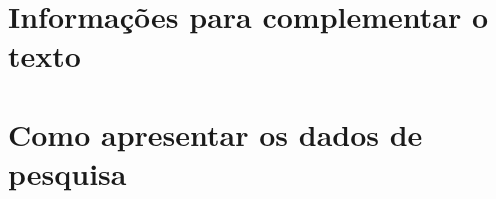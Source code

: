 
\begin{apendicesenv}
\chapter{Informações para complementar o texto}
\lipsum[8]


\chapter{Como apresentar os dados de pesquisa}

\lipsum[8]

\end{apendicesenv}